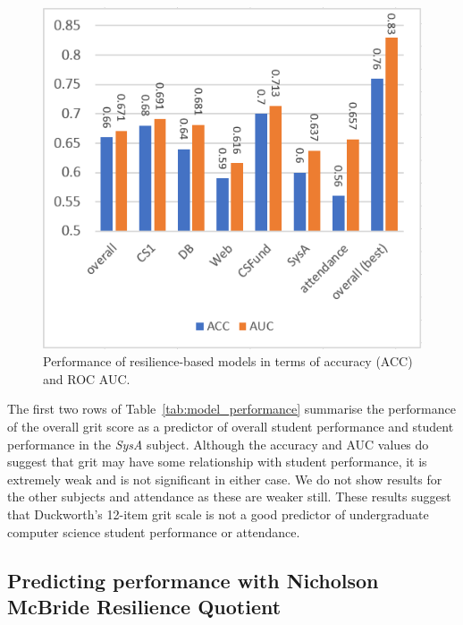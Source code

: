 \documentclass[sigconf]{acmart}
\begin{document}
\begin{figure} [h]
\centering
\includegraphics[width=.98\linewidth]{images/model_performance.png}
\caption{Performance of resilience-based models in terms of accuracy (ACC) and ROC AUC.}
\label{fig:model_performance} 
\end{figure}

The first two rows of Table~\ref{tab:model_performance} summarise the performance of the overall grit score as a predictor of overall student performance and student performance in the {\em SysA} subject. Although the accuracy and AUC values do suggest that grit may have some relationship with student performance, it is extremely weak and is not significant in either case. We do not show results for the other subjects and attendance as these are weaker still. These results suggest that Duckworth's 12-item grit scale is not a good predictor of undergraduate computer science student performance or attendance. 

\subsection{Predicting performance with Nicholson McBride Resilience Quotient}
\end{document}
